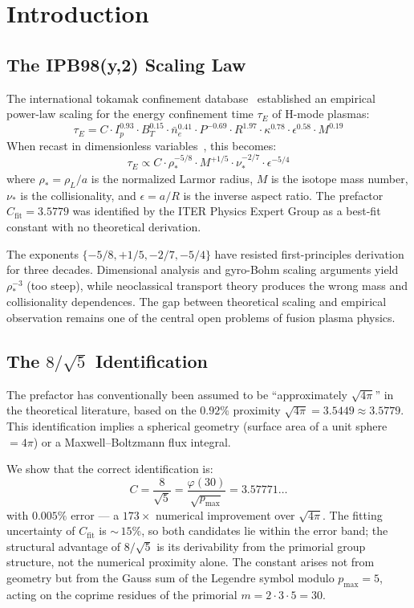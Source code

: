 \documentclass[11pt,letterpaper]{article}
\theoremstyle{definition}
\begin{document}
\clearpage
\tableofcontents
\clearpage

\section{Introduction}

\subsection{The IPB98(y,2) Scaling Law}

The international tokamak confinement database~\cite{iter1999} established an empirical power-law scaling for the energy confinement time $\tau_E$ of H-mode plasmas:
\[
\tau_E = C \cdot I_p^{0.93} \cdot B_T^{0.15} \cdot \bar{n}_e^{0.41}
        \cdot P^{-0.69} \cdot R^{1.97} \cdot \kappa^{0.78}
        \cdot \epsilon^{0.58} \cdot M^{0.19}
\]
When recast in dimensionless variables~\cite{petty2008, cordey2005}, this becomes:
\[
\tau_E \propto C \cdot \rho_*^{-5/8} \cdot M^{+1/5}
              \cdot \nu_*^{-2/7} \cdot \epsilon^{-5/4}
\]
where $\rho_* = \rho_L/a$ is the normalized Larmor radius, $M$ is the isotope mass number, $\nu_*$ is the collisionality, and $\epsilon = a/R$ is the inverse aspect ratio. The prefactor $C_{\text{fit}} = 3.5779$ was identified by the ITER Physics Expert Group as a best-fit constant with no theoretical derivation.

The exponents $\{-5/8, +1/5, -2/7, -5/4\}$ have resisted first-principles derivation for three decades. Dimensional analysis and gyro-Bohm scaling arguments yield $\rho_*^{-3}$ (too steep), while neoclassical transport theory produces the wrong mass and collisionality dependences. The gap between theoretical scaling and empirical observation remains one of the central open problems of fusion plasma physics.

\subsection{The $8/\sqrt{5}$ Identification}

The prefactor has conventionally been assumed to be ``approximately $\sqrt{4\pi}$'' in the theoretical literature, based on the $0.92\%$ proximity $\sqrt{4\pi} = 3.5449 \approx 3.5779$. This identification implies a spherical geometry (surface area of a unit sphere $= 4\pi$) or a Maxwell--Boltzmann flux integral.

We show that the correct identification is:
\[
C = \frac{8}{\sqrt{5}}
  = \frac{\varphi(30)}{\sqrt{p_{\text{max}}}}
  = 3.57771\ldots
\]
with $0.005\%$ error --- a $173\times$ numerical improvement over $\sqrt{4\pi}$. The fitting uncertainty of $C_{\text{fit}}$ is ${\sim}\,15\%$, so both candidates lie within the error band; the structural advantage of $8/\sqrt{5}$ is its derivability from the primorial group structure, not the numerical proximity alone. The constant arises not from geometry but from the Gauss sum of the Legendre symbol modulo $p_{\text{max}} = 5$, acting on the coprime residues of the primorial $m = 2 \cdot 3 \cdot 5 = 30$.
\end{document}
